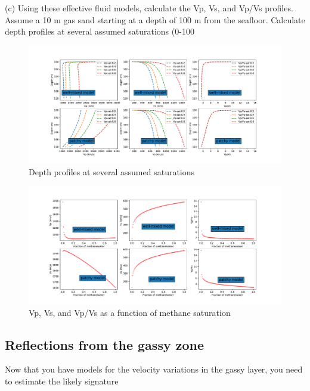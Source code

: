 \begin{problem}{(c)}
    Using these effective fluid models, calculate the Vp, Vs, and Vp/Vs profiles. Assume a 10 m gas sand starting at a depth of 100 m from the seafloor. Calculate depth profiles at several assumed saturations (0-100%
\end{problem}
\begin{solution}
    \begin{figure}[H]
        \centering
        \includegraphics[width=1.0\textwidth]{figures/homework-2/p1-2-c1.pdf}
        \caption{Depth profiles at several assumed saturations}
        \label{fig:p1-2-c1}
    \end{figure}
    \begin{figure}[H]
        \centering
        \includegraphics[width=1.0\textwidth]{figures/homework-2/p1-2-c2.pdf}
        \caption{Vp, Vs, and Vp/Vs as a function of methane saturation}
        \label{fig:p1-2-c2}
    \end{figure}
\end{solution}


\subsection{Reflections from the gassy zone}
Now that you have models for the velocity variations in the gassy layer, you need to estimate the likely signature

